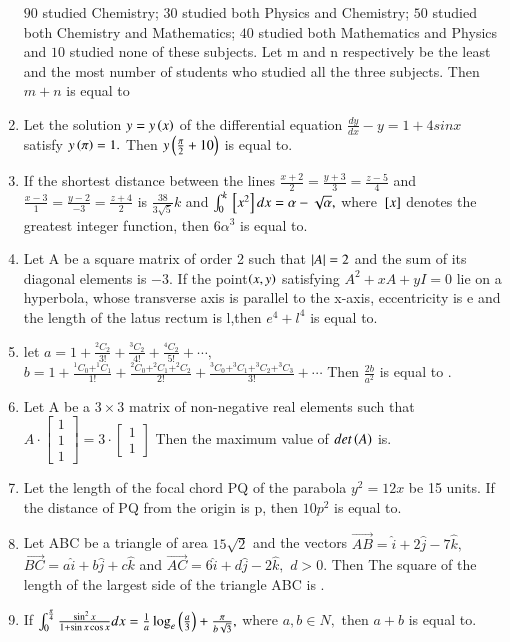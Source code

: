 \documentclass[journal]{IEEEtran}
\begin{document}
\begin{enumerate}[start=16]
$90$ studied Chemistry; $30$ studied both Physics and
Chemistry; $50$ studied both Chemistry and
Mathematics; $40$ studied both Mathematics and
Physics and $10$ studied none of these subjects. Let
m and n respectively be the least and the most
number of students who studied all the three
subjects. Then $m + n$ is equal to
\bigskip
\item Let the solution $y=y\left(x\right)$ of the differential equation $\frac{dy}{dx}-y=1+4sinx$ satisfy $y\left(\pi\right)=1.$ Then $y\left(\frac{\pi}{2}+10\right)$ is equal to.
\bigskip
\item If the shortest distance between the lines $\frac{x+2}{2}=\frac{y+3}{3}=\frac{z-5}{4}$ and $\frac{x-3}{1}=\frac{y-2}{-3}=\frac{z+4}{2}$ is $\frac{38}{3\sqrt{5}}k$ and $\int_{0}^{k}{}\left[x^{2}\right]dx=\alpha-\sqrt{\alpha
},$ where ${}\left[x\right]$ denotes the greatest integer function, then $6\alpha^{3}$ is equal to.
\bigskip
\item Let A be a square matrix of order 2 such that $\left\vert A\right\vert=2$
and the sum of its diagonal elements is $-3.$ If the point$\left(x,y\right)$ satisfying $A^{2}+xA+yI=0$ lie
on a hyperbola, whose transverse axis is parallel to
the x-axis, eccentricity is e and the length of the
latus rectum is l,then $e^{4}+l^{4}$ is equal to.
\bigskip
\item let $a=1+\frac{^2C_2}{3!}+\frac{^3C_2}{4!}+\frac{^4C_2}{5!}+\cdots,$
$b=1+\frac{^1C_0+^1C_1}{1!}+\frac{^2C_0+^2C_1+^2C_2}{2!}+\frac{^3C_0+^3C_1+^3C_2+^3C_3}{3!}+\cdots$ Then $\frac{2b}{a^{2}}$ is equal to .
\bigskip
\item Let A be a $3\times3$ matrix of non-negative real
elements such that $A \cdot \begin{bmatrix} 1 \\ 1 \\ 1 \end{bmatrix} = 3 \cdot \begin{bmatrix} 1 \\ 1 \end{bmatrix}
$ Then the maximum value of $det\left(A\right)$ is.
\bigskip
\item Let the length of the focal chord PQ of the
parabola $y^{2} = 12x$ be 15 units. If the distance of PQ
from the origin is p, then $10p^{2}$ is equal to.
\bigskip
\item Let ABC be a triangle of area $15\sqrt{2}$ and the vectors $\overrightarrow{AB}=\hat{i}+2\hat{j}-7\hat{k},$ $\overrightarrow{BC}=a\hat{i}+b\hat{j}+c\hat{k}$ and $\overrightarrow{AC}=6\hat{i}+d\hat{j}-2\hat{k},$ $d>0.$ Then The square of the length of the largest side of the triangle ABC is .
\bigskip
\item If $\int_{0}^{\frac{\pi}{4}}\frac{\sin^{2}{x}}{1+\sin{x}\cos{x}}dx=\frac{1}{a}\log_{e}\left(\frac{a}{3}\right)+\frac{\pi}{b\sqrt{3}},$ where $a,b\in N ,$ then $a+b$ is equal to. 
\end{enumerate}
\end{document}
